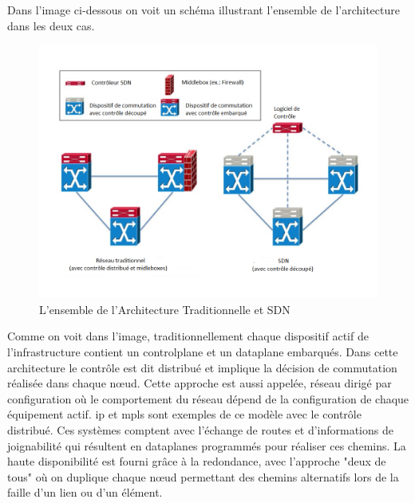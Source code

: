 Dans l'image ci-dessous on voit un schéma illustrant l'ensemble de l'architecture dans les deux cas.




\begin{figure}[!h] %
\includegraphics[width=15cm]{images/TraditionalVsSDN.png} %
\caption{ L'ensemble de l'Architecture Traditionnelle et SDN \cite{SurveySDNArchi}} %
\label{imgOverviewArchi} %
\end{figure} %


Comme on voit dans l'image, traditionnellement chaque dispositif actif de l'infrastructure contient un \gls{controlplane} et un \gls{dataplane} embarqués. Dans cette architecture le contrôle est dit distribué et implique la décision de commutation réalisée dans chaque nœud. Cette approche est aussi appelée, réseau dirigé par configuration où le comportement du réseau dépend de la configuration de chaque équipement actif.  \gls{ip} et \gls{mpls} sont exemples de ce modèle avec le contrôle distribué. Ces systèmes comptent avec l'échange de routes et d'informations de joignabilité qui résultent en \glspl{dataplane} programmés pour réaliser ces chemins. La haute disponibilité est fourni grâce à la redondance, avec l'approche "deux de tous" où on duplique chaque nœud permettant des chemins alternatifs lors de la faille d'un lien ou d'un élément. \cite{sdnbookControlDataPlanes}



